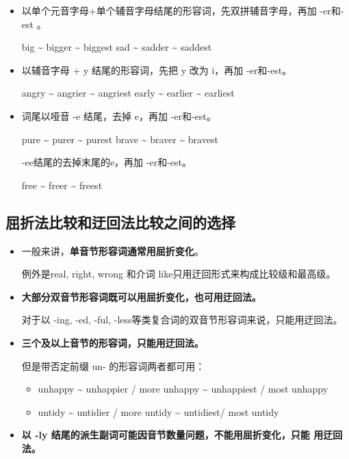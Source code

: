 \begin{itemize}
\item 以单个元音字母+单个辅音字母结尾的形容词，先双拼辅音字母，再加 -er和-est 。

  big \~{} bigger \~{} biggest \qquad sad \~{} sadder \~{} saddest

\item 以辅音字母 + y 结尾的形容词，先把 y 改为 i，再加 -er和-est。

  angry \~{} angrier \~{} angriest \qquad early \~{} earlier \~{} earliest

\item 词尾以哑音 -e 结尾，去掉 e，再加 -er和-est。

  pure \~{} purer \~{} purest \qquad brave \~{} braver \~{} bravest

  -ee结尾的去掉末尾的e，再加 -er和-est。

  free \~{} freer \~{} freest

\end{itemize}

\subsection{屈折法比较和迂回法比较之间的选择}
\begin{itemize}
\item 一般来讲，\textbf{单音节形容词通常用屈折变化}。

  例外是real, right, wrong 和介词 like只用迂回形式来构成比较级和最高级。

\item \textbf{大部分双音节形容词既可以用屈折变化，也可用迂回法。}

  对于以 -ing, -ed, -ful, -less等类复合词的双音节形容词来说，只能用迂回法。

\item \textbf{三个及以上音节的形容词，只能用迂回法。}

  但是带否定前缀 un- 的形容词两者都可用：
  \begin{itemize}
  \item unhappy \~{} unhappier / more unhappy \~{} unhappiest / most unhappy

  \item untidy \~{} untidier / more untidy \~{} untidiest/ most untidy
  \end{itemize}
\item \textbf{以 -ly 结尾的派生副词可能因音节数量问题，不能用屈折变化，只能
    用迂回法。}
\end{itemize}


